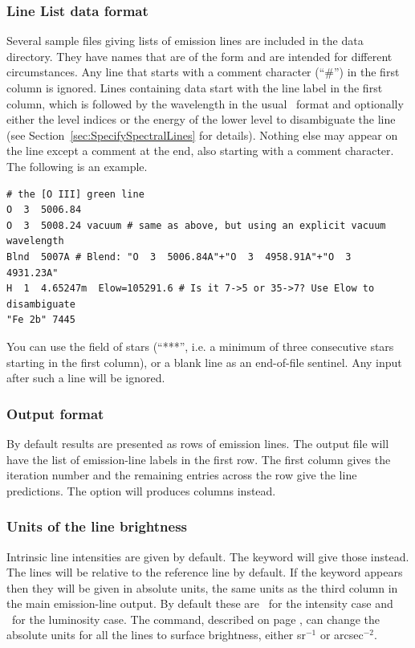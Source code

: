 \subsubsection{Line List data format}
\label{sec:LineListDataFormat}

Several sample
files giving lists of emission lines are included in the data directory.
They have names that are of the form 
and are intended for different circumstances.
Any line that starts with a comment character (``\#'') in the first column is ignored.
Lines containing data start with the line label in the first column,
which is followed by the wavelength in the usual \Cloudy\ format
and optionally either the level indices or the energy of the lower level to disambiguate the line
(see Section~\ref{sec:SpecifySpectralLines} for details).
Nothing else may appear on the line except a comment at the end, also starting with a comment character.
The following is an example.
\begin{verbatim}
# the [O III] green line
O  3  5006.84
O  3  5008.24 vacuum # same as above, but using an explicit vacuum wavelength
Blnd  5007A # Blend: "O  3  5006.84A"+"O  3  4958.91A"+"O  3  4931.23A"
H  1  4.65247m  Elow=105291.6 # Is it 7->5 or 35->7? Use Elow to disambiguate
"Fe 2b" 7445
\end{verbatim}
You can use the field of stars (``***'', i.e. a minimum of three consecutive stars
starting in the first column), or a blank line as an end-of-file sentinel. Any
input after such a line will be ignored.

\subsubsection{Output format}
By default results are presented as rows of emission lines.
The output file will have the list of emission-line labels in the first
row.  The first column gives the iteration number and the remaining
entries across the row give the line predictions.
The  option will produces columns instead.

\subsubsection{Units of the line brightness}
Intrinsic line intensities are given by default.
The keyword  will give those instead.
The lines will be relative to the reference line by default.
If the keyword  appears then they will be given
in absolute units, the same units as the third column in
the main emission-line output.
By default these are \ergpscmps\
for the intensity case and \ergps\ for the luminosity case.
The  command,
described on page \pageref{sec:CommandPrintLineSurfaceBrightness},
can change the absolute units for all the lines to surface brightness,
either sr$^{-1}$ or arcsec$^{-2}$.

